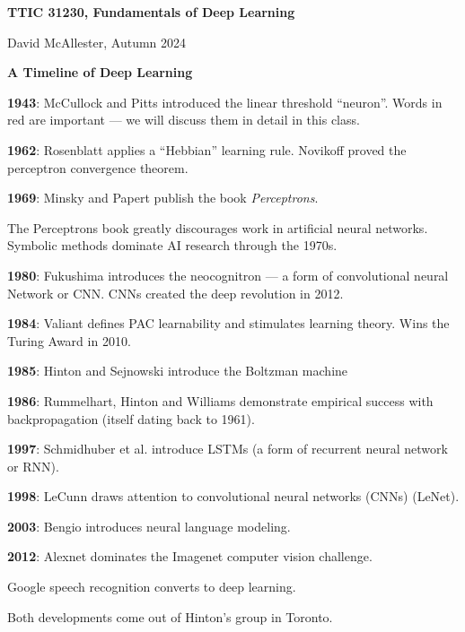 




{\Huge
  \centerline{\bf TTIC 31230,  Fundamentals of Deep Learning}
  \vfill
  \centerline{David McAllester, Autumn 2024}
  \vfill
  \centerline{\bf A Timeline of Deep Learning}
\vfill
\vfill



{\bf 1943}: McCullock and Pitts introduced the {\color{red} linear threshold ``neuron''}. Words in red are important --- we will discuss them in detail in this class.

\vfill
{\bf 1962}: Rosenblatt applies a ``Hebbian'' learning rule.  Novikoff proved the perceptron convergence theorem.

\vfill
{\bf 1969}: Minsky and Papert publish the book {\it Perceptrons}.

\vfill
The Perceptrons book greatly discourages work in artificial neural networks.  Symbolic methods dominate AI research through the 1970s.


{\bf 1980}: Fukushima introduces the neocognitron --- a form of {\color{red} convolutional neural Network or CNN}.  CNNs created the deep revolution in 2012.

\vfill
{\bf 1984}: Valiant defines PAC learnability and stimulates learning theory. Wins the Turing Award in 2010.

\vfill
{\bf 1985}: Hinton and Sejnowski introduce the Boltzman machine

\vfill
{\bf 1986}: Rummelhart, Hinton and Williams demonstrate empirical success with {\color{red} backpropagation} (itself dating back to 1961).


{\bf 1997}: Schmidhuber et al. introduce LSTMs (a form of {\color{red} recurrent neural network or RNN}).

\vfill
{\bf 1998}: LeCunn draws attention to convolutional neural networks (CNNs) (LeNet).

\vfill
{\bf 2003}: Bengio introduces {\color{red} neural language modeling}.


{\bf 2012}: Alexnet dominates the Imagenet computer vision challenge.

\vfill
Google speech recognition converts to deep learning.

\vfill
Both developments come out of Hinton's group in Toronto.

}
